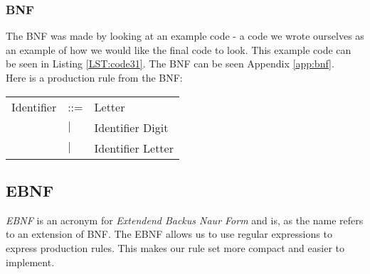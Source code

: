 \begin{comment}
			$Type$\\
			$While$\\
			$Width$\\
		\end{longtable}
	\end{comment}
	\subsubsection{BNF}
		The BNF was made by looking at an example code - a code we wrote ourselves as an example of how we would like the final code to look. This example code can be seen in Listing \ref{LST:code31}. The BNF can be seen Appendix \ref{app:bnf}. \\
		Here is a production rule from the BNF: \\
		\begin{tabular}{l l l}
		Identifier			&	::=	&Letter\\
							&$\mid$	&Identifier Digit\\
							&$\mid$	&Identifier Letter\\
		\end{tabular}
	
	\subsection{EBNF}
		{\it EBNF} is an acronym for {\it Extendend Backus Naur Form} and is, as the name refers to an extension of BNF.
		The EBNF allows us to use regular expressions to express production rules. 
		This makes our rule set more compact and easier to implement.
	
